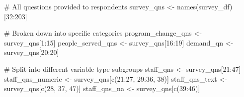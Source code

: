 \documentclass[
  letterpaper,
  DIV=11,
  numbers=noendperiod]{scrreprt}
\newenvironment{Shaded}{\begin{snugshade}}{\end{snugshade}}
\newcommand{\CommentTok}[1]{\textcolor[rgb]{0.37,0.37,0.37}{#1}}
\newcommand{\DecValTok}[1]{\textcolor[rgb]{0.68,0.00,0.00}{#1}}
\newcommand{\FunctionTok}[1]{\textcolor[rgb]{0.28,0.35,0.67}{#1}}
\newcommand{\NormalTok}[1]{\textcolor[rgb]{0.00,0.23,0.31}{#1}}
\newcommand{\OtherTok}[1]{\textcolor[rgb]{0.00,0.23,0.31}{#1}}
\newcommand{\SpecialCharTok}[1]{\textcolor[rgb]{0.37,0.37,0.37}{#1}}
\begin{document}
\begin{Shaded}
\begin{Highlighting}[]
\CommentTok{\# All questions provided to respondents}
\NormalTok{survey\_qns }\OtherTok{\textless{}{-}} \FunctionTok{names}\NormalTok{(survey\_df)[}\DecValTok{32}\SpecialCharTok{:}\DecValTok{203}\NormalTok{]}

\CommentTok{\# Broken down into specific categories}
\NormalTok{program\_change\_qns }\OtherTok{\textless{}{-}}\NormalTok{ survey\_qns[}\DecValTok{1}\SpecialCharTok{:}\DecValTok{15}\NormalTok{]}
\NormalTok{people\_served\_qns }\OtherTok{\textless{}{-}}\NormalTok{ survey\_qns[}\DecValTok{16}\SpecialCharTok{:}\DecValTok{19}\NormalTok{]}
\NormalTok{demand\_qn }\OtherTok{\textless{}{-}}\NormalTok{ survey\_qns[}\DecValTok{20}\SpecialCharTok{:}\DecValTok{20}\NormalTok{]}

\CommentTok{\# Split into different variable type subgroups}
\NormalTok{staff\_qns }\OtherTok{\textless{}{-}}\NormalTok{ survey\_qns[}\DecValTok{21}\SpecialCharTok{:}\DecValTok{47}\NormalTok{]}
\NormalTok{staff\_qns\_numeric }\OtherTok{\textless{}{-}}\NormalTok{ survey\_qns[}\FunctionTok{c}\NormalTok{(}\DecValTok{21}\SpecialCharTok{:}\DecValTok{27}\NormalTok{, }\DecValTok{29}\SpecialCharTok{:}\DecValTok{36}\NormalTok{, }\DecValTok{38}\NormalTok{)]}
\NormalTok{staff\_qns\_text }\OtherTok{\textless{}{-}}\NormalTok{ survey\_qns[}\FunctionTok{c}\NormalTok{(}\DecValTok{28}\NormalTok{, }\DecValTok{37}\NormalTok{, }\DecValTok{47}\NormalTok{)]}
\NormalTok{staff\_qns\_na }\OtherTok{\textless{}{-}}\NormalTok{ survey\_qns[}\FunctionTok{c}\NormalTok{(}\DecValTok{39}\SpecialCharTok{:}\DecValTok{46}\NormalTok{)]}


\end{Highlighting}
\end{Shaded}
\end{document}
